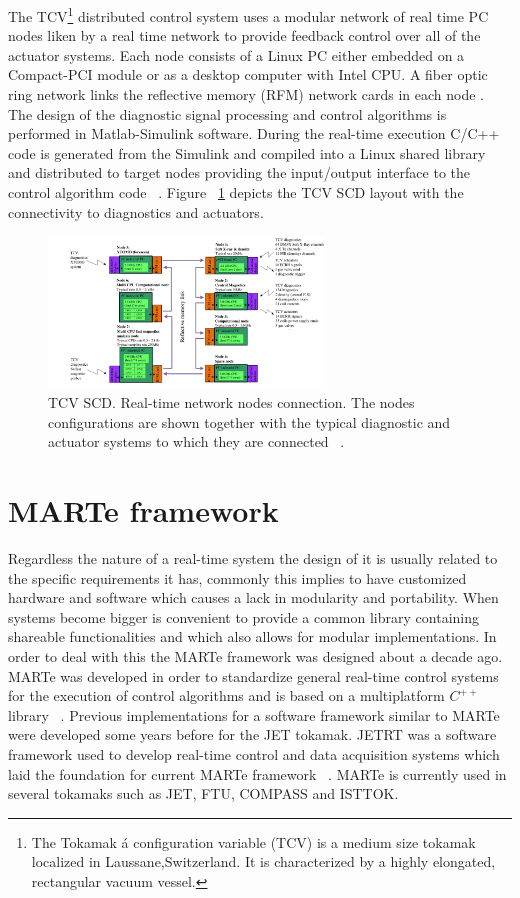 The TCV\footnote{The Tokamak \'a configuration variable (TCV) is  a medium size tokamak localized in Laussane,Switzerland. It is characterized by a highly elongated, rectangular vacuum vessel.} distributed control system uses a modular network of real time PC nodes liken by a real time network to provide feedback control over all of the actuator systems. Each node consists of a Linux PC either embedded on a Compact-PCI module or as a desktop computer with Intel CPU. A fiber optic ring network links the reflective memory (RFM) network cards in each node  \cite{TCVcntrl}.  The design of the diagnostic signal processing and control algorithms is performed in Matlab-Simulink software.  During the real-time execution  C/C++  code is generated from the Simulink and compiled  into a Linux shared library and distributed to target nodes  providing the input/output interface to the control algorithm code  ~\cite{TCVcntrl1}. Figure ~\ref{TCVcontrol} depicts the TCV SCD layout with the connectivity to diagnostics and actuators.


\begin{figure}[htbp]
	\centering
	\includegraphics[width=0.65\textwidth]{Chp2/TCVcntrl1.png}
	\caption{\label{TCVcontrol} TCV SCD. Real-time network nodes connection. The nodes configurations 	are shown together with the typical diagnostic and actuator systems to which they are connected  ~\cite{TCVcntrl1}.  }
\end{figure}

\section{MARTe framework}
Regardless the nature of a real-time system the design of it is usually related to the specific requirements it has, commonly this implies to have customized hardware and software which causes a lack in modularity and portability. When systems become bigger is convenient to provide a common library containing shareable functionalities and which also allows for modular implementations. In order to deal with this the MARTe framework was designed about a decade ago. MARTe was developed in order to standardize general real-time control systems for the execution of control algorithms and is based on a multiplatform $C^{++}$ library ~\cite{Neto2010}.  Previous implementations for a  software framework similar to MARTe were developed some years before for the JET tokamak. JETRT was a software framework used to develop real-time control and data acquisition systems which laid the foundation for current MARTe framework ~\cite{JETRT}. MARTe is currently used in several tokamaks such as JET, FTU, COMPASS and ISTTOK. 

